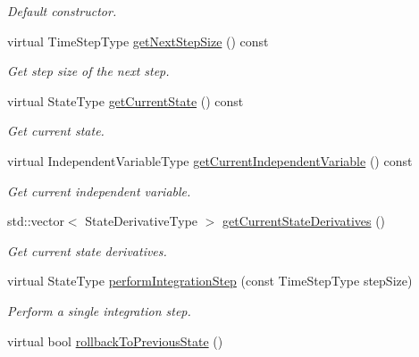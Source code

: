 \begin{DoxyCompactItemize}
\begin{DoxyCompactList}\small\item\em Default constructor. \end{DoxyCompactList}\item 
virtual Time\+Step\+Type \hyperlink{classtudat_1_1numerical__integrators_1_1RungeKuttaVariableStepSizeIntegrator_a25fef3ffc408b23a1c2b32351f54372d}{get\+Next\+Step\+Size} () const 
\begin{DoxyCompactList}\small\item\em Get step size of the next step. \end{DoxyCompactList}\item 
virtual State\+Type \hyperlink{classtudat_1_1numerical__integrators_1_1RungeKuttaVariableStepSizeIntegrator_aac981f6098e36439e8e041815437f342}{get\+Current\+State} () const 
\begin{DoxyCompactList}\small\item\em Get current state. \end{DoxyCompactList}\item 
virtual Independent\+Variable\+Type \hyperlink{classtudat_1_1numerical__integrators_1_1RungeKuttaVariableStepSizeIntegrator_a640c507f5895c305937d01bebb910b09}{get\+Current\+Independent\+Variable} () const 
\begin{DoxyCompactList}\small\item\em Get current independent variable. \end{DoxyCompactList}\item 
std\+::vector$<$ State\+Derivative\+Type $>$ \hyperlink{classtudat_1_1numerical__integrators_1_1RungeKuttaVariableStepSizeIntegrator_ae12f7cb2247bb43af9f24d303e6a30c5}{get\+Current\+State\+Derivatives} ()
\begin{DoxyCompactList}\small\item\em Get current state derivatives. \end{DoxyCompactList}\item 
virtual State\+Type \hyperlink{classtudat_1_1numerical__integrators_1_1RungeKuttaVariableStepSizeIntegrator_a34e884253297c9bfb17d756c36510cc4}{perform\+Integration\+Step} (const Time\+Step\+Type step\+Size)
\begin{DoxyCompactList}\small\item\em Perform a single integration step. \end{DoxyCompactList}\item 
virtual bool \hyperlink{classtudat_1_1numerical__integrators_1_1RungeKuttaVariableStepSizeIntegrator_a71350bc154120adfd9cf9871618eaf22}{rollback\+To\+Previous\+State} ()

\end{DoxyCompactItemize}
